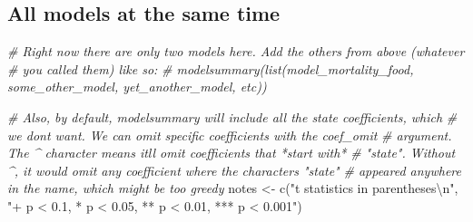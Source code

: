 \documentclass[
]{article}
\newenvironment{Shaded}{\begin{snugshade}}{\end{snugshade}}
\newcommand{\CommentTok}[1]{\textcolor[rgb]{0.56,0.35,0.01}{\textit{#1}}}
\newcommand{\FunctionTok}[1]{\textcolor[rgb]{0.00,0.00,0.00}{#1}}
\newcommand{\NormalTok}[1]{#1}
\newcommand{\OtherTok}[1]{\textcolor[rgb]{0.56,0.35,0.01}{#1}}
\newcommand{\SpecialCharTok}[1]{\textcolor[rgb]{0.00,0.00,0.00}{#1}}
\newcommand{\StringTok}[1]{\textcolor[rgb]{0.31,0.60,0.02}{#1}}
\begin{document}
\hypertarget{all-models-at-the-same-time-1}{%
\subsection{All models at the same
time}\label{all-models-at-the-same-time-1}}

\begin{Shaded}
\begin{Highlighting}[]
\CommentTok{\# Right now there are only two models here. Add the others from above (whatever }
\CommentTok{\# you called them) like so: }
\CommentTok{\# modelsummary(list(model\_mortality\_food, some\_other\_model, yet\_another\_model, etc))}

\CommentTok{\# Also, by default, modelsummary will include all the state coefficients, which}
\CommentTok{\# we don\textquotesingle{}t want. We can omit specific coefficients with the \textasciigrave{}coef\_omit\textasciigrave{}}
\CommentTok{\# argument. The \^{} character means it\textquotesingle{}ll omit coefficients that *start with*}
\CommentTok{\# "state". Without \^{}, it would omit any coefficient where the characters "state"}
\CommentTok{\# appeared anywhere in the name, which might be too greedy}
\NormalTok{notes }\OtherTok{\textless{}{-}} \FunctionTok{c}\NormalTok{(}\StringTok{"t statistics in parentheses}\SpecialCharTok{\textbackslash{}n}\StringTok{"}\NormalTok{,}
           \StringTok{"+ p \textless{} 0.1, * p \textless{} 0.05, ** p \textless{} 0.01, *** p \textless{} 0.001"}\NormalTok{)}


\end{Highlighting}
\end{Shaded}
\end{document}
